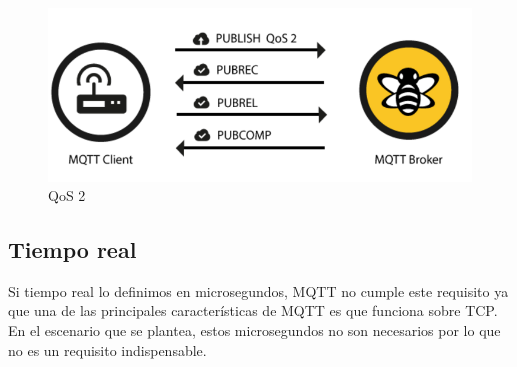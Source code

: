 \documentclass[12pt, twoside]{book}
\begin{document}
\begin{itemize}
\begin{figure}[h!]
\centering
\includegraphics[scale=0.3]{images/qos2}
\caption{QoS 2}\label{L408}
\end{figure}
\end{itemize}
\subsection{Tiempo real}
Si tiempo real lo definimos en microsegundos, MQTT no cumple este requisito ya que una de las principales características de MQTT es que funciona sobre TCP. En el escenario que se plantea, estos microsegundos no son necesarios por lo que no es un requisito indispensable.
\end{document}
